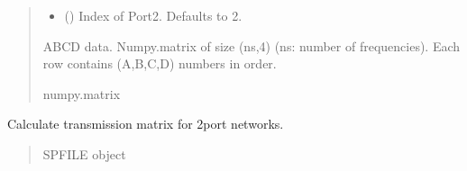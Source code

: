 \documentclass[letterpaper,10pt,english]{sphinxmanual}
\begin{document}
\begin{fulllineitems}
\begin{fulllineitems}
\begin{quote}
\begin{description}
\begin{itemize}
\item {}
\sphinxAtStartPar
{} (\sphinxstyleliteralemphasis{\sphinxupquote{, }}) \textendash{} Index of Port\sphinxhyphen{}2. Defaults to 2.

\end{itemize}

\sphinxAtStartPar
ABCD data. Numpy.matrix of size (ns,4) (ns: number of frequencies). Each row contains (A,B,C,D) numbers in order.

\sphinxAtStartPar
numpy.matrix

\end{description}\end{quote}

\end{fulllineitems}


\begin{fulllineitems}
\label{\detokenize{touchstone:touchstone.spfile.s2t}}
\pysigstartsignatures
{}
\pysigstopsignatures
\sphinxAtStartPar
Calculate transmission matrix for 2\sphinxhyphen{}port networks.
\begin{quote}\begin{description}
\sphinxAtStartPar
SPFILE object

\sphinxAtStartPar
{\hyperref[\detokenize{touchstone:touchstone.spfile}]{}}

\end{description}\end{quote}

\end{fulllineitems}


\begin{fulllineitems}
\label{\detokenize{touchstone:touchstone.spfile.scaledata}}
\pysigstartsignatures
{}
\pysigstopsignatures
\end{fulllineitems}


\end{fulllineitems}
\end{document}

